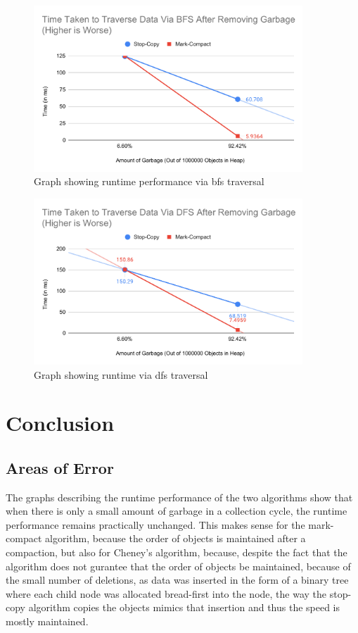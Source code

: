 \documentclass[index]{subfiles}
\begin{document}
\begin{figure}[H]
    \centering
    \includegraphics[width=0.9\textwidth]{pics/traverse-bfs-perf.pdf}
    \caption{Graph showing runtime performance via bfs traversal}
\end{figure}

\begin{figure}[H]
    \centering
    \includegraphics[width=0.9\textwidth]{pics/traverse-dfs-perf.pdf}
    \caption{Graph showing runtime via dfs traversal}
\end{figure}
\section{Conclusion}
\subsection{Areas of Error}

The graphs describing the runtime performance of the two algorithms show that when there is only a small amount of garbage in a collection cycle, the runtime performance remains practically unchanged. This makes sense for the mark-compact algorithm, because the order of objects is maintained after a compaction, but also for Cheney's algorithm, because, despite the fact that the algorithm does not gurantee that the order of objects be maintained, because of the small number of deletions, as data was inserted in the form of a binary tree where each child node was allocated bread-first into the node, the way the stop-copy algorithm copies the objects mimics that insertion and thus the speed is mostly maintained. 
\end{document}
